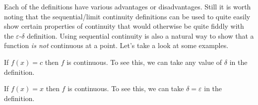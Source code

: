 
Each of the definitions have various advantages or disadvantages.
Still it is worth noting that the sequential/limit continuity definitions can be used to quite easily show certain properties of continuity that would otherwise be quite fiddly with the $\varepsilon$-$\delta$ definition. Using sequential continuity is also a natural way to show that a function \emph{is not} continuous at a point.
Let's take a look at some examples.

\begin{example}
	If $f(x) = c$ then $f$ is continuous. To see this, we can take any value of $\delta$ in the definition.
	\end{example}

\begin{example}[$f(x) = x$ is Continuous]
	If $f(x) = x$ then $f$ is continuous. To see this, we can take $\delta = \varepsilon$ in the definition.
	\end{example}

